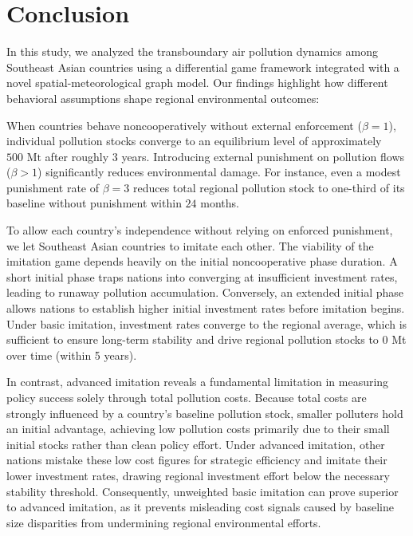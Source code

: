 \documentclass[a4paper,fleqn]{cas-dc}
\begin{document}
\section{Conclusion}

In this study, we analyzed the transboundary air pollution dynamics among Southeast Asian countries using a differential game framework integrated with a novel spatial-meteorological graph model. Our findings highlight how different behavioral assumptions shape regional environmental outcomes:

When countries behave noncooperatively without external enforcement ($\beta=1$), individual pollution stocks converge to an equilibrium level of approximately $500\text{ Mt}$ after roughly $3$ years. Introducing external punishment on pollution flows ($\beta > 1$) significantly reduces environmental damage. For instance, even a modest punishment rate of $\beta=3$ reduces total regional pollution stock to one-third of its baseline without punishment within $24$ months.

To allow each country's independence without relying on enforced punishment, we let Southeast Asian countries to imitate each other. The viability of the imitation game depends heavily on the initial noncooperative phase duration. A short initial phase traps nations into converging at insufficient investment rates, leading to runaway pollution accumulation. Conversely, an extended initial phase allows nations to establish higher initial investment rates before imitation begins. Under basic imitation, investment rates converge to the regional average, which is sufficient to ensure long-term stability and drive regional pollution stocks to 0 Mt over time (within 5 years). 

In contrast, advanced imitation reveals a fundamental limitation in measuring policy success solely through total pollution costs. Because total costs are strongly influenced by a country's baseline pollution stock, smaller polluters hold an initial advantage, achieving low pollution costs primarily due to their small initial stocks rather than clean policy effort. Under advanced imitation, other nations mistake these low cost figures for strategic efficiency and imitate their lower investment rates, drawing regional investment effort below the necessary stability threshold. Consequently, unweighted basic imitation can prove superior to advanced imitation, as it prevents misleading cost signals caused by baseline size disparities from undermining regional environmental efforts.
\end{document}
